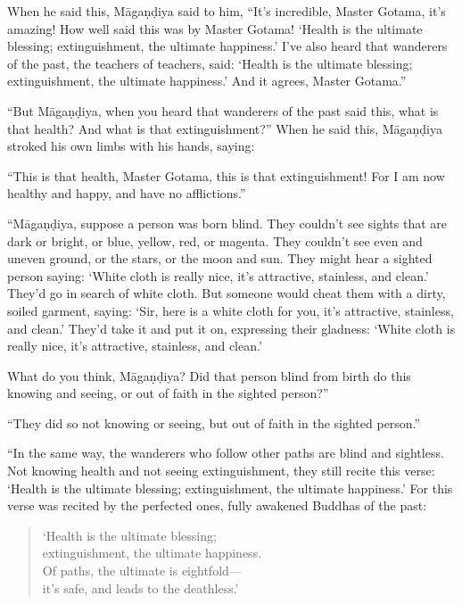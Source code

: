 \documentclass[12pt,openany]{book}%
\begin{document}
When he said this, \textsanskrit{Māgaṇḍiya} said to him, “It’s incredible, Master Gotama, it’s amazing! How well said this was by Master Gotama! ‘Health is the ultimate blessing; extinguishment, the ultimate happiness.’ I’ve also heard that wanderers of the past, the teachers of teachers, said: ‘Health is the ultimate blessing; extinguishment, the ultimate happiness.’ And it agrees, Master Gotama.” 

“But \textsanskrit{Māgaṇḍiya}, when you heard that wanderers of the past said this, what is that health? And what is that extinguishment?” When he said this, \textsanskrit{Māgaṇḍiya} stroked his own limbs with his hands, saying: 

“This is that health, Master Gotama, this is that extinguishment! For I am now healthy and happy, and have no afflictions.” 

“\textsanskrit{Māgaṇḍiya}, suppose a person was born blind. They couldn’t see sights that are dark or bright, or blue, yellow, red, or magenta. They couldn’t see even and uneven ground, or the stars, or the moon and sun. They might hear a sighted person saying: ‘White cloth is really nice, it’s attractive, stainless, and clean.’ They’d go in search of white cloth. But someone would cheat them with a dirty, soiled garment, saying: ‘Sir, here is a white cloth for you, it’s attractive, stainless, and clean.’ They’d take it and put it on, expressing their gladness: ‘White cloth is really nice, it’s attractive, stainless, and clean.’ 

What do you think, \textsanskrit{Māgaṇḍiya}? Did that person blind from birth do this knowing and seeing, or out of faith in the sighted person?” 

“They did so not knowing or seeing, but out of faith in the sighted person.” 

“In the same way, the wanderers who follow other paths are blind and sightless. Not knowing health and not seeing extinguishment, they still recite this verse: ‘Health is the ultimate blessing; extinguishment, the ultimate happiness.’ For this verse was recited by the perfected ones, fully awakened Buddhas of the past: 

\begin{verse}%
‘Health is the ultimate blessing; \\
extinguishment, the ultimate happiness. \\
Of paths, the ultimate is eightfold—\\
it’s safe, and leads to the deathless.' 

%
\end{verse}
\end{document}
